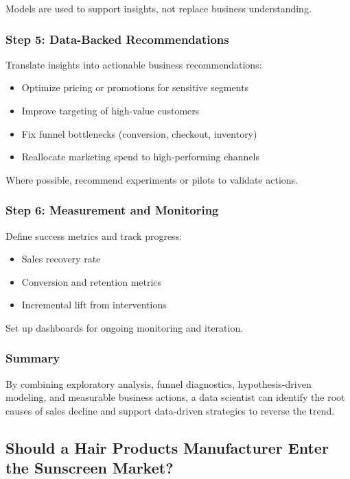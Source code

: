 \documentclass[10pt,a4paper]{article}
\begin{document}
	Models are used to support insights, not replace business understanding.
	
	\subsubsection{Step 5: Data-Backed Recommendations}
	
	Translate insights into actionable business recommendations:
	
	\begin{itemize}
	    \item Optimize pricing or promotions for sensitive segments
	    \item Improve targeting of high-value customers
	    \item Fix funnel bottlenecks (conversion, checkout, inventory)
	    \item Reallocate marketing spend to high-performing channels
	\end{itemize}
	
	Where possible, recommend experiments or pilots to validate actions.
	
	\subsubsection{Step 6: Measurement and Monitoring}
	
	Define success metrics and track progress:
	
	\begin{itemize}
	    \item Sales recovery rate
	    \item Conversion and retention metrics
	    \item Incremental lift from interventions
	\end{itemize}
	
	Set up dashboards for ongoing monitoring and iteration.
	
	\subsubsection{Summary}
	
	By combining exploratory analysis, funnel diagnostics, hypothesis-driven modeling, and measurable business actions, a data scientist can identify the root causes of sales decline and support data-driven strategies to reverse the trend.
	
	
	\subsection{Should a Hair Products Manufacturer Enter the Sunscreen Market?}
	
\end{document}
